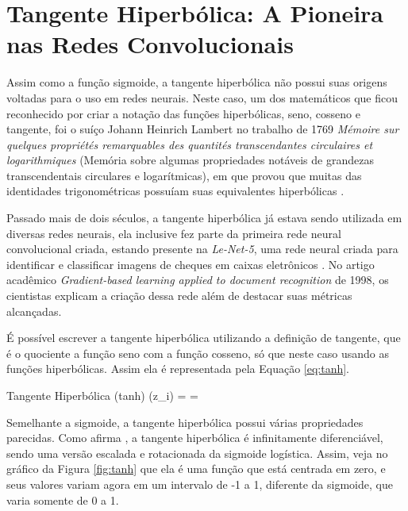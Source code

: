 \section{Tangente Hiperbólica: A Pioneira nas Redes Convolucionais}

Assim como a função sigmoide, a tangente hiperbólica não possui suas origens voltadas para o uso em redes neurais. Neste caso, um dos matemáticos que ficou reconhecido por criar a notação das funções hiperbólicas, seno, cosseno e tangente, foi o suíço Johann Heinrich Lambert no trabalho de 1769 \textit{Mémoire sur quelques propriétés remarquables des quantités transcendantes circulaires et logarithmiques} (Memória sobre algumas propriedades notáveis de grandezas transcendentais circulares e logarítmicas), em que provou que muitas das identidades trigonométricas possuíam suas equivalentes hiperbólicas \parencite{TanhLambert}.

Passado mais de dois séculos, a tangente hiperbólica já estava sendo utilizada em diversas redes neurais, ela inclusive fez parte da primeira rede neural convolucional criada, estando presente na \textit{Le-Net-5}, uma rede neural criada para identificar e classificar imagens de cheques em caixas eletrônicos \parencite{LecunLeNet1998}. No artigo acadêmico \textit{Gradient-based learning applied to document recognition} de 1998, os cientistas \textcite{LecunLeNet1998} explicam a criação dessa rede além de destacar suas métricas alcançadas.

É possível escrever a tangente hiperbólica utilizando a definição de tangente, que é o quociente a função seno com a função cosseno, só que neste caso usando as funções hiperbólicas. Assim ela é representada pela Equação \ref{eq:tanh}.

\begin{equacaodestaque}{Tangente Hiperbólica (tanh)}
    \tanh(z_i) =  = 
    \label{eq:tanh}
\end{equacaodestaque}

Semelhante a sigmoide, a tangente hiperbólica possui várias propriedades parecidas. Como afirma \textcite{ActivationFunctionsLederer}, a tangente hiperbólica é infinitamente diferenciável, sendo uma versão escalada e rotacionada da sigmoide logística. Assim, veja no gráfico da Figura \ref{fig:tanh} que ela é uma função que está centrada em zero, e seus valores variam agora em um intervalo de -1 a 1, diferente da sigmoide, que varia somente de 0 a 1.


